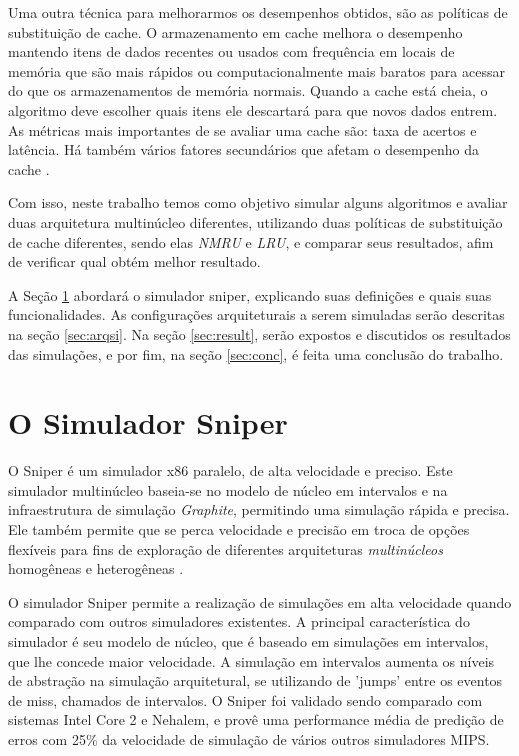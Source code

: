 \documentclass[12pt]{article}
\begin{document}
Uma outra técnica para melhorarmos os desempenhos obtidos, são as políticas de substituição de cache. O armazenamento em cache melhora o desempenho mantendo itens de dados recentes ou usados com frequência em locais de memória que são mais rápidos ou computacionalmente mais baratos para acessar do que os armazenamentos de memória normais. Quando a cache está cheia, o algoritmo deve escolher quais itens ele descartará para que novos dados entrem. As métricas mais importantes de se avaliar uma cache são: taxa de acertos e latência. Há também vários fatores secundários que afetam o desempenho da cache \cite{ALAN}.

Com isso, neste trabalho temos como objetivo simular alguns algoritmos e avaliar duas arquitetura multinúcleo diferentes, utilizando duas políticas de substituição de cache diferentes, sendo elas \textit{NMRU} e \textit{LRU}, e comparar seus resultados, afim de verificar qual obtém melhor resultado. 

A Seção \ref{sec:sniper} abordará o simulador sniper, explicando suas definições e quais suas funcionalidades. As configurações arquiteturais a serem simuladas serão descritas na seção \ref{sec:arqsi}. Na seção \ref{sec:result}, serão expostos e discutidos os resultados das simulações, e por fim, na seção \ref{sec:conc}, é feita uma conclusão do trabalho.

\section{O Simulador Sniper} \label{sec:sniper}
O Sniper é um simulador x86 paralelo, de alta velocidade e preciso. Este simulador multinúcleo baseia-se no modelo de núcleo em intervalos e na infraestrutura de simulação \textit{Graphite}, permitindo uma simulação rápida e precisa. Ele também permite que se perca velocidade e precisão em troca de opções flexíveis para fins de exploração de diferentes arquiteturas \textit{multinúcleos} homogêneas e heterogêneas \cite{sniper}.

O simulador Sniper permite a realização de simulações em alta velocidade quando comparado com outros simuladores existentes. A principal característica do simulador é seu modelo de núcleo, que é baseado em simulações em intervalos, que lhe concede maior velocidade. A simulação em intervalos aumenta os níveis de abstração na simulação arquitetural, se utilizando de 'jumps' entre os eventos de miss, chamados de intervalos. O Sniper foi validado sendo comparado com sistemas Intel Core 2 e Nehalem, e provê uma performance média de predição de erros com 25\% da velocidade de simulação de vários outros simuladores MIPS.
\end{document}
